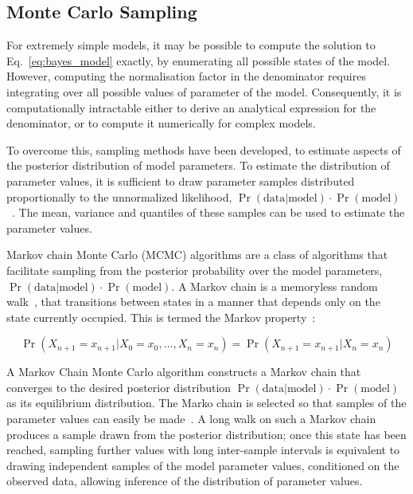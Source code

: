 \subsection{Monte Carlo Sampling}
For extremely simple models, it may be possible to compute the solution to Eq.~\ref{eq:bayes_model} exactly, by enumerating all possible states of the model. However, computing the normalisation factor in the denominator requires integrating over all possible values of parameter of the model. Consequently, it is computationally intractable either to derive an analytical expression for the denominator, or to compute it numerically for complex models. 

To overcome this, sampling methods have been developed, to estimate aspects of the posterior distribution of model parameters. To estimate the distribution of parameter values, it is sufficient to draw parameter samples distributed proportionally to the unnormalized likelihood, $\Pr(\text{data}|\text{model}) \cdot \Pr(\text{model})$~\cite{hastings70}. The mean, variance and quantiles of these samples can be used to estimate the parameter values.

Markov chain Monte Carlo (MCMC) algorithms are a class of algorithms that facilitate sampling from the posterior probability over the model parameters, $\Pr(\text{data}|\text{model}) \cdot \Pr(\text{model})$. A Markov chain is a memoryless random walk~\cite{Norris1998}, that transitions between states in a manner that depends only on the state currently occupied. This is termed the Markov property~\cite{hoel1972}:

\begin{equation}
\Pr(X_{n+1} = x_{n+1} | X_0 = x_0, \dots, X_n = x_n) = \Pr(X_{n+1} = x_{n+1} | X_n = x_n)
\label{eq:markov_property}
\end{equation}

A Markov Chain Monte Carlo algorithm constructs a Markov chain that converges to the desired posterior distribution $\Pr(\text{data}|\text{model}) \cdot \Pr(\text{model})$ as its equilibrium distribution. The Marko chain is selected so that samples of the parameter values can easily be made~\cite{Smith1993}. A long walk on such a Markov chain produces a sample drawn from the posterior distribution; once this state has been reached, sampling further values with long inter-sample intervals is equivalent to drawing independent samples of the model parameter values, conditioned on the observed data, allowing inference of the distribution of parameter values. 

